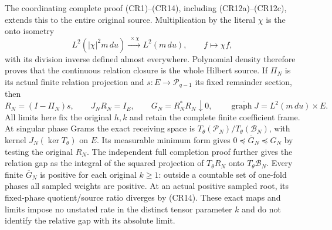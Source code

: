 The coordinating complete proof (CR1)--(CR14), including (CR12a)--(CR12c),
extends this to the entire original source. Multiplication by the
literal $\chi$ is the onto isometry
\[
 L^2(|\chi|^2m\,du)\xrightarrow{\ \times\chi\ }L^2(m\,du),
 \qquad f\longmapsto\chi f,
\]
with its division inverse defined almost everywhere. Polynomial
density therefore proves that the continuous relation closure is
the whole Hilbert source. If $\Pi_N$ is its actual finite relation
projection and $s:E\to\mathcal P_{q-1}$ its fixed remainder section,
then
\[
 R_N=(I-\Pi_N)s,\qquad J_NR_N=I_E,\qquad
 G_N=R_N^*R_N\downarrow0,
 \qquad\overline{\operatorname{graph}J}=L^2(m\,du)\times E.
\]
All limits here fix the original $h,k$ and retain the complete
finite coefficient frame. At singular phase Grams the exact
receiving space is $T_\theta(\mathcal P_N)/T_\theta(\mathcal B_N)$,
with kernel $J_N(\ker T_\theta)$ on $E$. Its measurable minimum
form gives $0\preceq\overline G_N\preceq G_N$ by testing the
original $R_N$. The independent full completion proof further
gives the relation gap as the integral of the squared projection
of $T_\theta R_N$ onto $T_\theta\mathcal B_N$. Every finite
$\overline G_N$ is positive for each original $k\ge1$: outside
a countable set of one-fold phases all sampled weights are
positive. At an actual positive sampled root, its fixed-phase
quotient/source ratio diverges by (CR14). These exact maps and
limits impose no unstated rate in the distinct tensor parameter
$k$ and do not identify the relative gap with its absolute limit.

